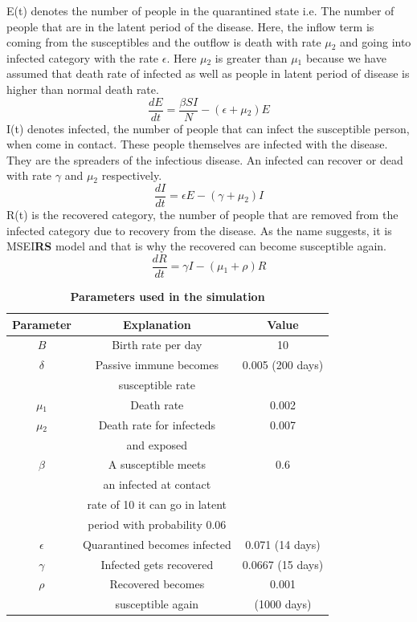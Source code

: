 \documentclass[prl,12pt,citeautoscript,reprint]{revtex4-1}
\begin{document}
E(t) denotes the number of people in the quarantined state i.e. The number of people that are in the latent period of the disease. Here, the inflow term is coming from the susceptibles and the outflow is death with rate $\mu{_2}$ and going into infected category with the rate $\epsilon$. Here $\mu{_2}$ is greater than $\mu{_1}$ because we have assumed that death rate of infected as well as people in latent period of disease is higher than normal death rate.
$$\frac{dE}{dt} = \frac{\beta S I}{N} - (\epsilon + \mu{_2}) E$$
I(t) denotes infected, the number of people that can infect the susceptible person, when come in contact. These people themselves are infected with the disease. They are the spreaders of the infectious disease. An infected can recover or dead with rate $\gamma$ and $\mu{_2}$ respectively. 
$$\frac{dI}{dt} = \epsilon E - (\gamma + \mu{_2})I$$
R(t) is the recovered category, the number of people that are removed from the infected category due to recovery from the disease. As the name suggests, it is MSEI\textbf{RS} model and that is why the recovered can become susceptible again. 
$$\frac{dR}{dt} = \gamma I - (\mu{_1} + \rho) R$$

\begin{table}[H]
    \centering
     \begin{tabular}{|c|c|c|} 
\hline
Parameter & Explanation & Value\\[0.7ex] 
 \hline
 $B$ & Birth rate per day & 10 \\ 
 \hline
 $\delta$ & Passive immune becomes& 0.005 (200 days) \\ 
  & susceptible rate &  \\ 
 \hline
 $\mu{_1}$ & Death rate & 0.002 \\ 
 \hline
 $\mu{_2}$ & Death rate for infecteds& 0.007 \\ 
  &and exposed&  \\ 
 \hline
 $\beta$ & A susceptible meets  & 0.6 \\ 
  & an infected at contact  & \\
  &rate of 10 it can go in latent& \\ 
  &period with probability 0.06 &  \\ 
 \hline
 $\epsilon$ & Quarantined becomes infected & 0.071 (14 days) \\ 
 \hline
  $\gamma$ & Infected gets recovered & 0.0667 (15 days) \\ 
 \hline

 $\rho$ & Recovered becomes & 0.001  \\ 
 &susceptible again &(1000 days) \\ 
 \hline
 
 \end{tabular}
    \caption{\textbf{Parameters used in the simulation}}
    \label{tab:tab_2}
\end{table}
\end{document}
